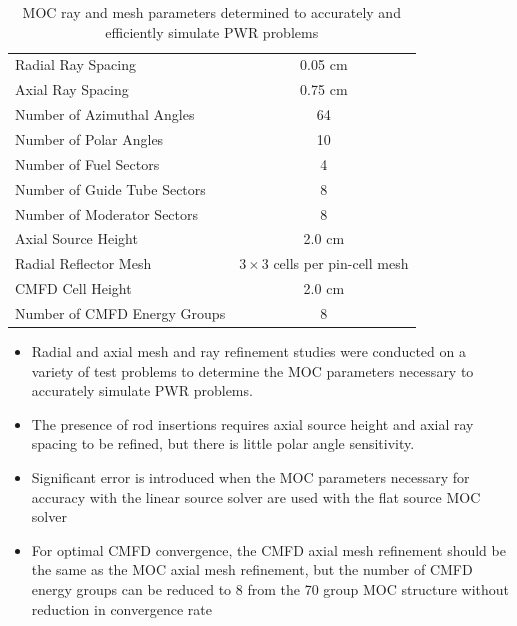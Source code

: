 \begin{table}[ht]
	\centering
	\caption{MOC ray and mesh parameters determined to accurately and efficiently simulate PWR problems}
	\medskip
	\begin{tabular}{lc}
		\hline
		Radial Ray Spacing & 0.05 cm \\
		Axial Ray Spacing & 0.75 cm \\
		Number of Azimuthal Angles & 64 \\
		Number of Polar Angles & 10 \\
		\hline
		Number of Fuel Sectors & 4 \\
		Number of Guide Tube Sectors & 8 \\
		Number of Moderator Sectors & 8 \\
		Axial Source Height & 2.0 cm \\
		Radial Reflector Mesh & $3\times 3$ cells per pin-cell mesh \\
		\hline
		\ac{CMFD} Cell Height & 2.0 cm \\
		Number of \ac{CMFD} Energy Groups & 8 \\
		\hline
	\end{tabular}
	\label{tab:final-params}
\end{table}

\clearpage

\vfill
\begin{highlightsbox}[frametitle=Highlights]
\begin{itemize}
  \item Radial and axial mesh and ray refinement studies were conducted on a variety of test problems to determine the \ac{MOC} parameters necessary to accurately simulate \ac{PWR} problems.
  \item The presence of rod insertions requires axial source height and axial ray spacing to be refined, but there is little polar angle sensitivity.
  \item Significant error is introduced when the \ac{MOC} parameters necessary for accuracy with the linear source solver are used with the flat source \ac{MOC} solver
  \item For optimal \ac{CMFD} convergence, the \ac{CMFD} axial mesh refinement should be the same as the \ac{MOC} axial mesh refinement, but the number of \ac{CMFD} energy groups can be reduced to 8 from the 70 group \ac{MOC} structure without reduction in convergence rate
  \end{itemize}
\end{highlightsbox}
\vfill